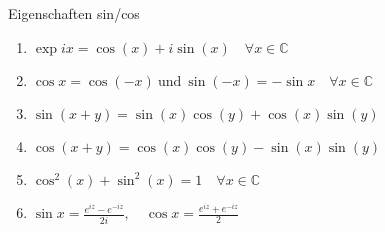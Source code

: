 \begin{theorem}{Eigenschaften sin/cos}
   \begin{enumerate}
       \item $\exp ix = \cos(x) + i \sin(x) \quad \forall x \in \mathbb{C}$
       \item $\cos x = \cos(-x) ~\text{und}~ \sin(-x) = -\sin x \quad\forall x \in \mathbb{C}$
       \item $\sin(x + y) = \sin(x)\cos(y) + \cos(x)\sin(y)$
       \item $\cos(x + y) = \cos(x)\cos(y) - \sin(x)\sin(y)$
       \item $\cos^2(x) + \sin^2(x) = 1 \quad \forall x \in \mathbb{C}$ 
       \item $\sin x = \frac{e^{iz} - e^{-iz}}{2i}, \quad \cos x = \frac{e^{iz} + e^{-iz}}{2}$
   \end{enumerate} 
\end{theorem}

